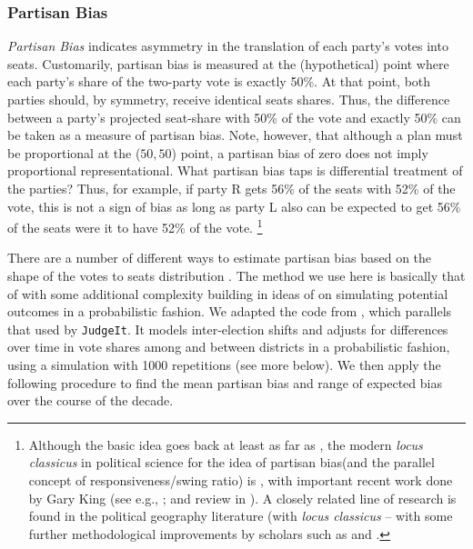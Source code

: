 \subsubsection*{Partisan Bias}
%
    \textit{Partisan Bias} indicates asymmetry in the translation of each party’s votes into seats. Customarily, partisan bias is measured at the (hypothetical) point where each party’s share of the two-party vote is exactly 50\%. At that point, both parties should, by symmetry, receive identical seats shares. Thus, the difference between a party’s projected seat-share with 50\% of the vote and exactly 50\% can be taken as a measure of partisan bias. Note, however, that although a plan must be proportional at the ($50,50$) point, a partisan bias of zero does not imply proportional representational. What partisan bias taps is differential treatment of the parties? Thus, for example, if party R gets 56\% of the seats with 52\% of the vote, this is not a sign of bias as long as party L also can be expected to get 56\% of the seats were it to have 52\% of the vote.
    \footnote{Although the basic idea goes back at least as far as \citet{Dahl1956}, the modern \textit{locus classicus} in political science for the idea of partisan bias(and the parallel concept of responsiveness/swing ratio) is \citet{Tufte1973}, with important recent work done by Gary King (see e.g., \citep{GelmanKing1994_unifiedAJPS}; and review in \citet{GrofmanKing2007}). A closely related line of research is found in the political geography literature (with \textit{locus classicus} \citet{Brookes1959, Brookes1960} -- with some further methodological improvements by scholars such as \citet{Johnston1994, Rossiter1997} and \citet{Johnston2002}.}   
\par
    There are a number of different ways to estimate partisan bias based on the shape of the votes to seats distribution \citep{Tufte1973, Grofman1983, Browning_King_1987_seats_votes, GelmanKing1994_unifiedAJPS, Grofman_et_al_1997_SwingRatio_Bias, Zingher2016_bias_swingratio_JEPP}. The method we use here is basically that of \citet{Tufte1973} with some additional complexity building in ideas of \citet{GelmanKing1994_unifiedAJPS} on simulating potential outcomes in a probabilistic fashion. We adapted the code from \citet{Kastellec_et_al_2008_PS}, which parallels that used by \texttt{JudgeIt}. It models inter-election shifts and adjusts for differences over time in vote shares among and between districts in a probabilistic fashion, using a simulation with 1000 repetitions (see more below). We then apply the following procedure to find the mean partisan bias and range of expected bias over the course of the decade.
